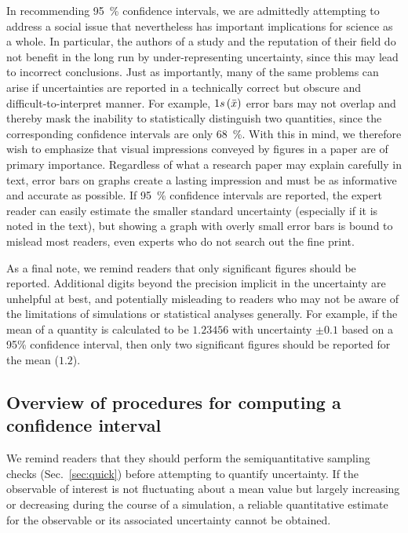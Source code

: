 In recommending 95~\% confidence intervals, we are admittedly attempting to address a social issue that nevertheless has important implications for science as a whole. In particular, the authors of a study and the reputation of their field do not benefit in the long run by under-representing uncertainty, since this may lead to incorrect conclusions. Just as importantly, many of the same problems can arise if uncertainties are reported in a technically correct but obscure and difficult-to-interpret manner. For example, $1s\left( \bar{x} \right)$ error bars may not overlap and thereby mask the inability to statistically distinguish two quantities, since the corresponding confidence intervals are only 68~\%. With this in mind, we therefore wish to emphasize that visual impressions conveyed by figures in a paper are of primary importance. Regardless of what a research paper may explain carefully in text, error bars on graphs create a lasting impression and must be as informative and accurate as possible. If 95~\% confidence intervals are reported, the expert reader can easily estimate the smaller standard uncertainty (especially if it is noted in the text), but showing a graph with overly small error bars is bound to mislead most readers, even experts who do not search out the fine print.

As a final note, we remind readers that only significant figures should be reported.
Additional digits beyond the precision implicit in the uncertainty are unhelpful at best, and potentially misleading to readers who may not be aware of the limitations of simulations or statistical analyses generally.
For example, if the mean of a quantity is calculated to be $1.23456$ with uncertainty $\pm 0.1$ based on a 95\% confidence interval, then only two significant figures should be reported for the mean ($1.2$).


\subsection{Overview of procedures for computing a confidence interval}
We remind readers that they should perform the semiquantitative sampling checks (Sec.\ \ref{sec:quick}) before attempting to quantify uncertainty.  If the observable of interest is not fluctuating about a mean value but largely increasing or decreasing during the course of a simulation, a reliable quantitative estimate for the observable or its associated uncertainty cannot be obtained.

